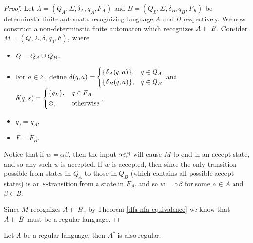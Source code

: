 \begin{proof}
    Let $A = (Q_A, \Sigma, \delta_A, q_A, F_A)$ and $B = (Q_B, \Sigma, \delta_B, q_B, F_B)$ be determinstic finite automata recognizing language $A$ and $B$ respectively. We now construct a non-determinstic finite automaton which recognizes $A \kern-0.2ex+\kern-1.5ex+\kern0.4ex B$. Consider $M = \left(Q, \Sigma, \delta, q_0, F\right)$, where
    \begin{itemize}
        \item $Q = Q_A \cup Q_B$,
        \item For $a \in \Sigma$, define $\delta(q, a) = \begin{dcases}
            \{\delta_A(q, a)\}, &q \in Q_A \\
            \{\delta_B(q, a)\}, &q \in Q_B \\
        \end{dcases}$ and $\delta(q, \varepsilon) = \begin{dcases}
            \{q_B\}, &q \in F_A \\
            \varnothing, &\textrm{otherwise} \\
        \end{dcases}$,
        \item $q_0 = q_A$,
        \item $F = F_B$.
    \end{itemize}
    Notice that if $w = \alpha\beta$, then the input $\alpha\varepsilon\beta$ will cause $M$ to end in an accept state, and so any such $w$ is accepted. If $w$ is accepted, then since the only transition possible from states in $Q_A$ to those in $Q_B$ (which contains all possible accept states) is an $\varepsilon$-transition from a state in $F_A$, and so $w = \alpha\beta$ for some $\alpha \in A$ and $\beta \in B$.

    Since $M$ recognizes $A \kern-0.2ex+\kern-1.5ex+\kern0.4ex B$, by Theorem \ref{dfa-nfa-equivalence} we know that $A \kern-0.2ex+\kern-1.5ex+\kern0.4ex B$ must be a regular language.
\end{proof}

\begin{thm}\label{regular-language-kleene-star}
    Let $A$ be a regular language, then $A^{*}$ is also regular.
\end{thm}

